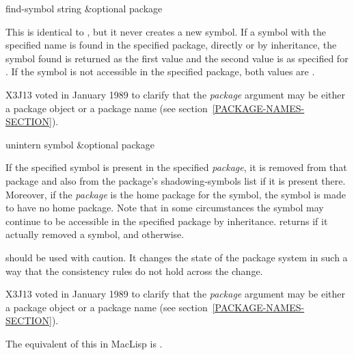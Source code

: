 \begin{defun}[Function]
find-symbol string &optional package

This is identical to , but it never creates a new symbol.  If
a symbol with the specified name is found in the specified package,
directly or by inheritance, the symbol found is returned as the first
value and the second value is as specified for .  If the
symbol is not accessible in the specified package, both values are
{\false}.

\begin{new}
X3J13 voted in January 1989
to clarify that the \emph{package} argument may be either a package object
or a package name (see section~\ref{PACKAGE-NAMES-SECTION}).
\end{new}
\end{defun}

\begin{defun}[Function]
unintern symbol &optional package

If the specified symbol is present in the specified \emph{package}, it is
removed from that package and also from the package's shadowing-symbols
list if it is present there.  Moreover, if the \emph{package} is the home
package for the symbol, the symbol is made to have no home package.
Note that in some circumstances the symbol may continue to be accessible
in the specified package by inheritance.
 returns {\true} if it actually removed a symbol,
and {\false} otherwise.

 should be used with caution.  It changes the state of the
package system in such a way that the consistency rules do not hold
across the change.

\begin{new}
X3J13 voted in January 1989
to clarify that the \emph{package} argument may be either a package object
or a package name (see section~\ref{PACKAGE-NAMES-SECTION}).
\end{new}

\beforenoterule
\begin{incompatibility}
The equivalent of this in MacLisp is .
\end{incompatibility}
\afternoterule
\end{defun}

